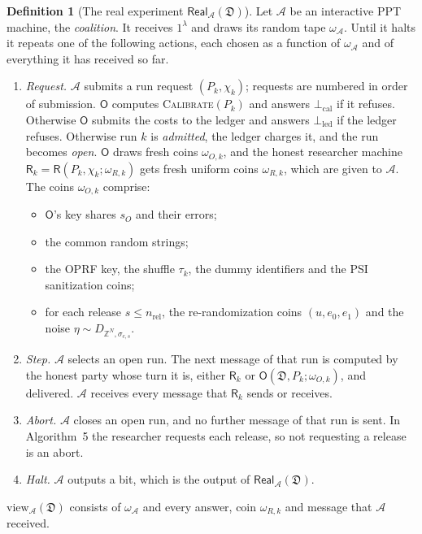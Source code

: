 \documentclass[11pt]{article}
\theoremstyle{definition}
\newtheorem{definition}{Definition}[section]
\theoremstyle{plain}
\newcommand{\Rp}{\mathsf{R}}
\newcommand{\Op}{\mathsf{O}}
\newcommand{\Z}{\mathbb{Z}}
\newcommand{\view}{\mathrm{view}}
\newcommand{\bD}{\mathfrak D}
\newcommand{\Real}{\mathsf{Real}}
\newcommand{\Cal}{\textsc{Calibrate}}
\newcommand{\nrel}{n_{\mathrm{rel}}}
\begin{document}
\begin{definition}[The real experiment $\Real_{\mathcal A}(\bD)$]\label{def:exp}
Let $\mathcal A$ be an interactive PPT machine, the \emph{coalition}. It receives $1^\lambda$ and draws its random tape $\omega_{\mathcal A}$. Until it halts it repeats one of the following actions, each chosen as a function of $\omega_{\mathcal A}$ and of everything it has received so far.
\begin{enumerate}[nosep,label=(\alph*)]
  \item \emph{Request.} $\mathcal A$ submits a run request $(P_k,\chi_k)$; requests are numbered in order of submission. $\Op$ computes \Cal$(P_k)$ and answers $\bot_{\mathrm{cal}}$ if it refuses. Otherwise $\Op$ submits the costs to the ledger and answers $\bot_{\mathrm{led}}$ if the ledger refuses. Otherwise run $k$ is \emph{admitted}, the ledger charges it, and the run becomes \emph{open}. $\Op$ draws fresh coins $\omega_{O,k}$, and the honest researcher machine $\Rp_k=\Rp(P_k,\chi_k;\omega_{R,k})$ gets fresh uniform coins $\omega_{R,k}$, which are given to $\mathcal A$. The coins $\omega_{O,k}$ comprise:
  \begin{itemize}[nosep]
    \item $\Op$'s key shares $s_O$ and their errors;
    \item the common random strings;
    \item the OPRF key, the shuffle $\tau_k$, the dummy identifiers and the PSI sanitization coins;
    \item for each release $s\le\nrel$, the re-randomization coins $(u,e_0,e_1)$ and the noise $\eta\sim D_{\Z^N,\sigma_{c,s}}$.
  \end{itemize}
  \item \emph{Step.} $\mathcal A$ selects an open run. The next message of that run is computed by the honest party whose turn it is, either $\Rp_k$ or $\Op(\bD,P_k;\omega_{O,k})$, and delivered. $\mathcal A$ receives every message that $\Rp_k$ sends or receives.
  \item \emph{Abort.} $\mathcal A$ closes an open run, and no further message of that run is sent. In Algorithm~5 the researcher requests each release, so not requesting a release is an abort.
  \item \emph{Halt.} $\mathcal A$ outputs a bit, which is the output of $\Real_{\mathcal A}(\bD)$.
\end{enumerate}
$\view_{\mathcal A}(\bD)$ consists of $\omega_{\mathcal A}$ and every answer, coin $\omega_{R,k}$ and message that $\mathcal A$ received.
\end{definition}
\end{document}
